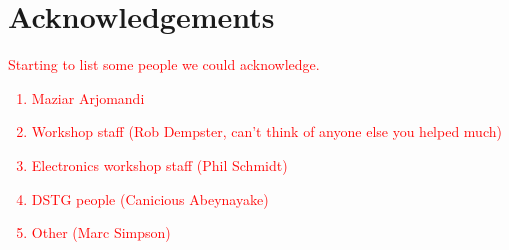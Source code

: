 \documentclass[main.tex]{subfiles}
\begin{document}
{}	%
\chapter*{Acknowledgements} 
\textcolor{red}{Starting to list some people we could acknowledge.
\begin{enumerate}
\item Maziar Arjomandi
\item Workshop staff (Rob Dempster, can't think of anyone else you helped much)
\item Electronics workshop staff (Phil Schmidt)
\item DSTG people (Canicious Abeynayake)
\item Other (Marc Simpson)
\end{enumerate}}
\newpage

{}	%
\renewcommand{\baselinestretch}{1.2}\normalsize 	%
\tableofcontents
\renewcommand{\baselinestretch}{1.3}\normalsize 	%
\newpage

{}	%
\listoffigures
\newpage

{}	%
\listoftables
\newpage


\printnomenclature
\newpage
\end{document}
